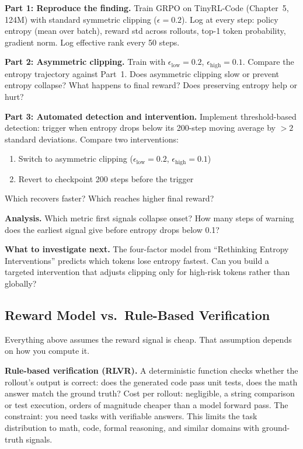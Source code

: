 \begin{exercise}

\textbf{Part 1: Reproduce the finding.} Train GRPO on TinyRL-Code (Chapter~5, 124M) with standard symmetric clipping ($\epsilon = 0.2$). Log at every step: policy entropy (mean over batch), reward std across rollouts, top-1 token probability, gradient norm. Log effective rank every 50 steps.

\textbf{Part 2: Asymmetric clipping.} Train with $\epsilon_{\mathrm{low}} = 0.2$, $\epsilon_{\mathrm{high}} = 0.1$. Compare the entropy trajectory against Part~1. Does asymmetric clipping slow or prevent entropy collapse? What happens to final reward? Does preserving entropy help or hurt?

\textbf{Part 3: Automated detection and intervention.} Implement threshold-based detection: trigger when entropy drops below its 200-step moving average by $> 2$ standard deviations. Compare two interventions:
\begin{enumerate}[label=(\roman*)]
  \item Switch to asymmetric clipping ($\epsilon_{\mathrm{low}} = 0.2$, $\epsilon_{\mathrm{high}} = 0.1$)
  \item Revert to checkpoint 200 steps before the trigger
\end{enumerate}
Which recovers faster? Which reaches higher final reward?

\textbf{Analysis.} Which metric first signals collapse onset? How many steps of warning does the earliest signal give before entropy drops below 0.1?

\textbf{What to investigate next.} The four-factor model from ``Rethinking Entropy Interventions'' predicts which tokens lose entropy fastest. Can you build a targeted intervention that adjusts clipping only for high-risk tokens rather than globally?
\end{exercise}

\subsection*{Reward Model vs.\ Rule-Based Verification}

Everything above assumes the reward signal is cheap. That assumption depends on how you compute it.

\textbf{Rule-based verification (RLVR).} A deterministic function checks whether the rollout's output is correct: does the generated code pass unit tests, does the math answer match the ground truth? Cost per rollout: negligible, a string comparison or test execution, orders of magnitude cheaper than a model forward pass. The constraint: you need tasks with verifiable answers. This limits the task distribution to math, code, formal reasoning, and similar domains with ground-truth signals.

